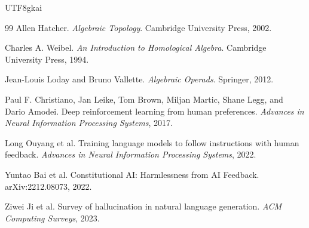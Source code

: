 \documentclass[12pt]{article}
\begin{document}
\begin{CJK*}{UTF8}{gkai}
\begin{thebibliography}{99}
Allen Hatcher.
\newblock \emph{Algebraic Topology}.
\newblock Cambridge University Press, 2002.

Charles A. Weibel.
\newblock \emph{An Introduction to Homological Algebra}.
\newblock Cambridge University Press, 1994.

Jean-Louis Loday and Bruno Vallette.
\newblock \emph{Algebraic Operads}.
\newblock Springer, 2012.

Paul F. Christiano, Jan Leike, Tom Brown, Miljan Martic, Shane Legg, and Dario Amodei.
\newblock Deep reinforcement learning from human preferences.
\newblock \emph{Advances in Neural Information Processing Systems}, 2017.

Long Ouyang et al.
\newblock Training language models to follow instructions with human feedback.
\newblock \emph{Advances in Neural Information Processing Systems}, 2022.

Yuntao Bai et al.
\newblock Constitutional AI: Harmlessness from AI Feedback.
\newblock arXiv:2212.08073, 2022.

Ziwei Ji et al.
\newblock Survey of hallucination in natural language generation.
\newblock \emph{ACM Computing Surveys}, 2023.

\end{thebibliography}

\end{CJK*}
\end{document}
